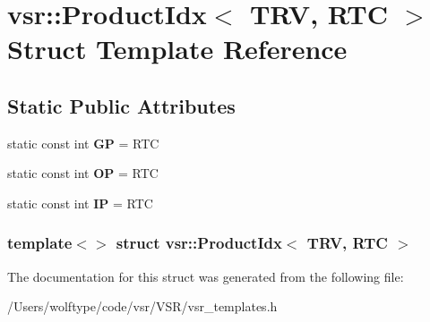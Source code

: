 \hypertarget{structvsr_1_1_product_idx_3_01_t_r_v_00_01_r_t_c_01_4}{\section{vsr\-:\-:Product\-Idx$<$ T\-R\-V, R\-T\-C $>$ Struct Template Reference}
\label{structvsr_1_1_product_idx_3_01_t_r_v_00_01_r_t_c_01_4}
}
\subsection*{Static Public Attributes}
\begin{DoxyCompactItemize}
\item 
\hypertarget{structvsr_1_1_product_idx_3_01_t_r_v_00_01_r_t_c_01_4_a9ace9eed235f9946a699b601106b2fa6}{static const int {\bfseries G\-P} = R\-T\-C}\label{structvsr_1_1_product_idx_3_01_t_r_v_00_01_r_t_c_01_4_a9ace9eed235f9946a699b601106b2fa6}

\item 
\hypertarget{structvsr_1_1_product_idx_3_01_t_r_v_00_01_r_t_c_01_4_ac8db5e8f55d7fbaf8f01b88c661a6619}{static const int {\bfseries O\-P} = R\-T\-C}\label{structvsr_1_1_product_idx_3_01_t_r_v_00_01_r_t_c_01_4_ac8db5e8f55d7fbaf8f01b88c661a6619}

\item 
\hypertarget{structvsr_1_1_product_idx_3_01_t_r_v_00_01_r_t_c_01_4_a192fa444db1cca07294a4f954d54b40b}{static const int {\bfseries I\-P} = R\-T\-C}\label{structvsr_1_1_product_idx_3_01_t_r_v_00_01_r_t_c_01_4_a192fa444db1cca07294a4f954d54b40b}

\end{DoxyCompactItemize}
\subsubsection*{template$<$$>$ struct vsr\-::\-Product\-Idx$<$ T\-R\-V, R\-T\-C $>$}



The documentation for this struct was generated from the following file\-:\begin{DoxyCompactItemize}
\item 
/\-Users/wolftype/code/vsr/\-V\-S\-R/vsr\-\_\-templates.\-h\end{DoxyCompactItemize}
